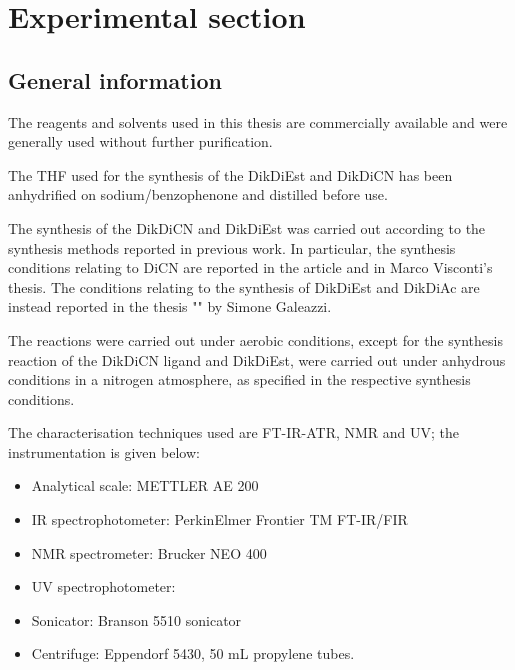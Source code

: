 \documentclass[../Master.tex]{subfiles}
\begin{document}
\chapter{Experimental section}\label{cha:experimental-section}

\section{General information}
The reagents and solvents used in this thesis are commercially available and were generally used without further purification.

The THF used for the synthesis of the DikDiEst and DikDiCN has been anhydrified on sodium/benzophenone and distilled before use.

The synthesis of the DikDiCN and DikDiEst was carried out according to the synthesis methods reported in previous work. In particular, the synthesis conditions relating to DiCN are reported in the article \cite{carlucci_heterometallic_2010} and in Marco Visconti's thesis. The conditions relating to the synthesis of DikDiEst and DikDiAc are instead reported in the thesis "" by Simone Galeazzi.


The reactions were carried out under aerobic conditions, except for the synthesis reaction of the
DikDiCN ligand and DikDiEst, were carried out under anhydrous conditions in a nitrogen atmosphere, as specified in the respective synthesis conditions.

The characterisation techniques used are FT-IR-ATR, NMR and UV; the instrumentation is given below:

\begin{itemize}
	\item Analytical scale: METTLER AE 200
	\item IR spectrophotometer: PerkinElmer Frontier TM FT-IR/FIR
	\item NMR spectrometer: Brucker NEO 400
	\item UV spectrophotometer:
	\item Sonicator: Branson 5510 sonicator
	\item Centrifuge: Eppendorf 5430, 50 mL propylene tubes.
\end{itemize}
\end{document}

